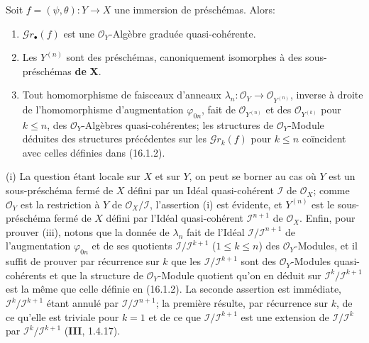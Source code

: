 \begin{proposition}[16.1.5]
Soit $f=(\psi,\theta):Y\to X$ une immersion de préschémas. Alors:
\begin{enumerate}
\item[\textup{(i)}] $\mathscr{G}r_\bullet(f)$ est une $\mathcal{O}_Y$-Algèbre graduée
quasi-cohérente.
\item[\textup{(ii)}] Les $Y^{(n)}$ sont des préschémas, canoniquement isomorphes à des
sous-préschémas \textbf{de} $\mathbf{X}$.
\item[\textup{(iii)}] Tout homomorphisme de faisceaux d'anneaux
$\lambda_n:\mathcal{O}_Y\to\mathcal{O}_{Y^{(n)}}$, inverse à droite de
l'homomorphisme d'augmentation $\varphi_{0n}$, fait de
$\mathcal{O}_{Y^{(n)}}$ et des $\mathcal{O}_{Y^{(k)}}$ pour $k\leq n$, des
$\mathcal{O}_Y$-Algèbres quasi-cohérentes; les structures de
$\mathcal{O}_Y$-Module déduites des structures précédentes sur les
$\mathscr{G}r_k(f)$ pour $k\leq n$ coïncident avec celles définies dans
\textup{(16.1.2)}.
\end{enumerate}
\end{proposition}

\noindent(i) La question étant locale sur $X$ et sur $Y$, on peut se borner au cas
où $Y$ est un sous-préschéma fermé de $X$ défini par un Idéal quasi-cohérent
$\mathscr{I}$ de $\mathcal{O}_X$; comme $\mathcal{O}_Y$ est la restriction à
$Y$ de $\mathcal{O}_X/\mathscr{I}$, l'assertion (i) est évidente, et $Y^{(n)}$
est le sous-préschéma fermé de $X$ défini par l'Idéal quasi-cohérent
$\mathscr{I}^{n+1}$ de $\mathcal{O}_X$. Enfin, pour prouver (iii), notons que la
donnée de $\lambda_n$ fait de l'Idéal
$\mathscr{I}/\mathscr{I}^{n+1}$ de l'augmentation $\varphi_{0n}$ et de ses
quotients $\mathscr{I}/\mathscr{I}^{k+1}$ ($1\leq k\leq n$) des
$\mathcal{O}_Y$-Modules, et il suffit de prouver par récurrence sur $k$ que les
$\mathscr{I}/\mathscr{I}^{k+1}$ sont des $\mathcal{O}_Y$-Modules
quasi-cohérents et que la structure de $\mathcal{O}_Y$-Module quotient qu'on en
déduit sur $\mathscr{I}^k/\mathscr{I}^{k+1}$ est la même que celle définie en
(16.1.2). La seconde assertion est immédiate,
$\mathscr{I}^k/\mathscr{I}^{k+1}$ étant annulé par
$\mathscr{I}/\mathscr{I}^{n+1}$; la première résulte, par récurrence sur $k$,
de ce qu'elle est triviale pour $k=1$ et de ce que
$\mathscr{I}/\mathscr{I}^{k+1}$ est une extension de
$\mathscr{I}/\mathscr{I}^k$ par
$\mathscr{I}^k/\mathscr{I}^{k+1}$ (\textbf{III}, 1.4.17).

